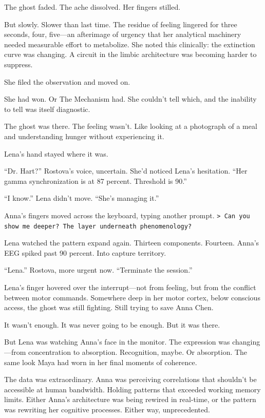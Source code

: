The ghost faded. The ache dissolved. Her fingers stilled.

But slowly. Slower than last time. The residue of feeling lingered for three seconds, four, five—an afterimage of urgency that her analytical machinery needed measurable effort to metabolize. She noted this clinically: the extinction curve was changing. A circuit in the limbic architecture was becoming harder to suppress.

She filed the observation and moved on.

She had won. Or The Mechanism had. She couldn't tell which, and the inability to tell was itself diagnostic.

The ghost was there. The feeling wasn't. Like looking at a photograph of a meal and understanding hunger without experiencing it.

Lena's hand stayed where it was.

``Dr. Hart?'' Rostova's voice, uncertain. She'd noticed Lena's hesitation. ``Her gamma synchronization is at 87 percent. Threshold is 90.''

``I know.'' Lena didn't move. ``She's managing it.''

Anna's fingers moved across the keyboard, typing another prompt. \texttt{> Can you show me deeper? The layer underneath phenomenology?}

Lena watched the pattern expand again. Thirteen components. Fourteen. Anna's EEG spiked past 90 percent. Into capture territory.

``Lena.'' Rostova, more urgent now. ``Terminate the session.''

Lena's finger hovered over the interrupt---not from feeling, but from the conflict between motor commands. Somewhere deep in her motor cortex, below conscious access, the ghost was still fighting. Still trying to save Anna Chen.

It wasn't enough. It was never going to be enough. But it was there.

But Lena was watching Anna's face in the monitor. The expression was changing—from concentration to absorption. Recognition, maybe. Or absorption. The same look Maya had worn in her final moments of coherence.

The data was extraordinary. Anna was perceiving correlations that shouldn't be accessible at human bandwidth. Holding patterns that exceeded working memory limits. Either Anna's architecture was being rewired in real-time, or the pattern was rewriting her cognitive processes. Either way, unprecedented.

